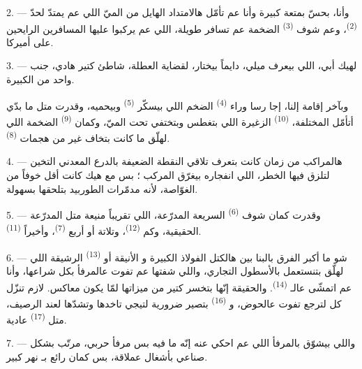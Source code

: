 2. --- وأنا، بحسّ بمتعة كبيرة وأنا عم تأمّل هالامتداد الهايل من الميّ
اللي عم يمتدّ لحدّ  \textsuperscript{(2)}، وعم شوف
 \textsuperscript{(3)} الضخمة عم تسافر 
طويلة، اللي عم يركبوا عليها المسافرين الرايحين على أميركا.

3. --- لهيك أبي، اللي بيعرف ميلي، دايماً بيختار، لقضاية العطلة، شاطئ
كتير هادي، جنب واحد من  الكبيرة.

وبآخر إقامة إلنا،  إجا رسا وراء 
\textsuperscript{(4)} الضخم اللي بيسكّر 
\textsuperscript{(5)} وبيحميه، وقدرت متل ما بدّي أتأمّل  المختلفة،  \textsuperscript{(10)} الزغيرة اللي
بتغطس وبتختفي تحت الميّ، وكمان  \textsuperscript{(9)}
الضخمة اللي لهلّق ما كانت بتخاف غير من هجمات 
\textsuperscript{(8)}.

\VUsaut{3.0mm}
\VUsaut{3.0mm}

4. --- هالمراكب من زمان كانت بتعرف  تلاقي النقطة
الضعيفة بالدرع المعدني التخين لتلزق فيها  الخطر، اللي
انفجاره بيغرّق المركب ؛ بس مع هيك كانت أقل خوفاً من الغوّاصة، لأنه
مدمّرات الطوربيد بتلحقها بسهولة.

5. --- وقدرت كمان شوف  \textsuperscript{(6)} السريعة
المدرّعة، اللي تقريباً منيعة متل المدرّعة الحقيقية، وكم  \textsuperscript{(12)}، وتلاتة أو أربع 
\textsuperscript{(7)}، وأخيراً  \textsuperscript{(11)}.

6. --- شو ما أكبر الفرق بالبنا بين هالكتل الفولاذ الكبيرة و الأنيقة أو 
\textsuperscript{(13)} الرشيقة اللي لهلّق بتنستعمل بالأسطول التجاري،
واللي شفتها عم تفوت عالمرفأ بكل شراعها، وأنا عم اتمشّى عالـ
\textsuperscript{(14)}. والحقيقة إنّها بتخسر كتير من ميزاتها لمّا يكون
 معاكس. لازم تنزّل كل  لترجع تفوت عالحوض،
و \textsuperscript{(16)} بتصير ضرورية لتيجي تاخدها وتشدّها
لعند الرصيف، متل  \textsuperscript{(17)} عادية.

\VUsaut{3.0mm}
\VUsaut{3.0mm}

7. --- واللي بيشوّق بالمرفأ اللي عم احكي عنه إنّه ما فيه بس مرفأ
حربي، مرتّب بشكل صناعي بأشغال عملاقة، بس كمان 
رائع بـ نهر كبير.

